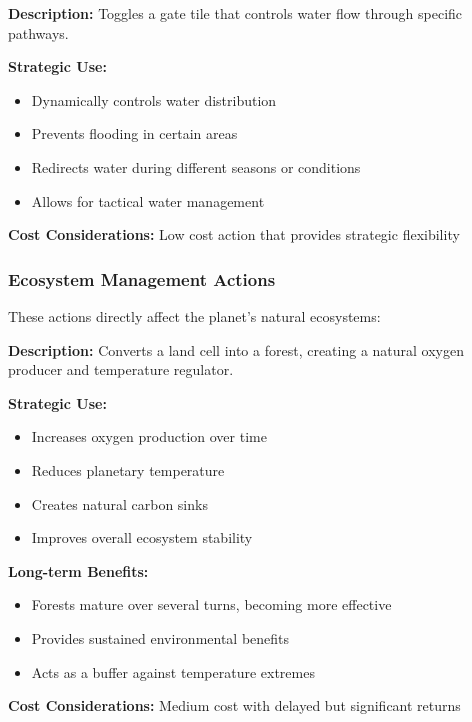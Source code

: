 \documentclass[12pt,a4paper]{article}
\begin{document}
\begin{tcolorbox}[colback=blue!5,colframe=blue!50!black,title=Open/Close Gate]
\textbf{Description:} Toggles a gate tile that controls water flow through specific pathways.

\textbf{Strategic Use:}
\begin{itemize}
    \item Dynamically controls water distribution
    \item Prevents flooding in certain areas
    \item Redirects water during different seasons or conditions
    \item Allows for tactical water management
\end{itemize}

\textbf{Cost Considerations:} Low cost action that provides strategic flexibility
\end{tcolorbox}

\subsubsection{Ecosystem Management Actions}

These actions directly affect the planet's natural ecosystems:

\begin{tcolorbox}[colback=green!5,colframe=green!50!black,title=Plant Forest]
\textbf{Description:} Converts a land cell into a forest, creating a natural oxygen producer and temperature regulator.

\textbf{Strategic Use:}
\begin{itemize}
    \item Increases oxygen production over time
    \item Reduces planetary temperature
    \item Creates natural carbon sinks
    \item Improves overall ecosystem stability
\end{itemize}

\textbf{Long-term Benefits:}
\begin{itemize}
    \item Forests mature over several turns, becoming more effective
    \item Provides sustained environmental benefits
    \item Acts as a buffer against temperature extremes
\end{itemize}

\textbf{Cost Considerations:} Medium cost with delayed but significant returns
\end{tcolorbox}
\end{document}
